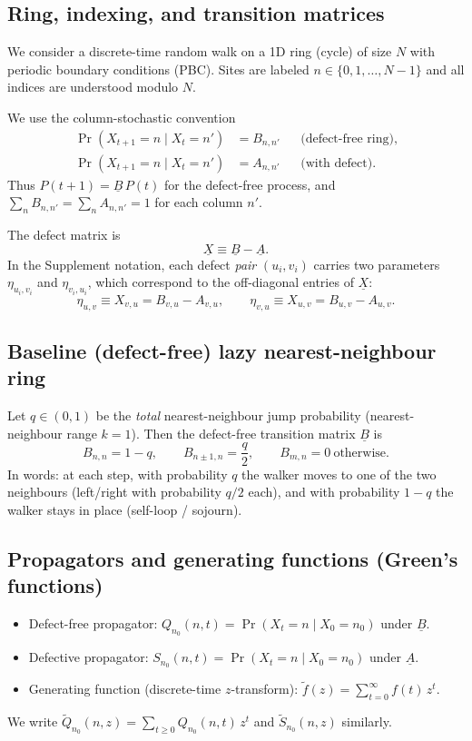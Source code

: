 \documentclass[11pt]{article}
\begin{document}
\subsection{Ring, indexing, and transition matrices}

We consider a discrete-time random walk on a 1D ring (cycle) of size $N$ with periodic boundary conditions (PBC).
Sites are labeled $n\in\{0,1,\dots,N-1\}$ and all indices are understood modulo $N$.

We use the column-stochastic convention
\[
\begin{aligned}
\Pr(X_{t+1}=n\mid X_t=n') &= B_{n,n'} &&\text{(defect-free ring)},\\
\Pr(X_{t+1}=n\mid X_t=n') &= A_{n,n'} &&\text{(with defect)}.
\end{aligned}
\]
Thus $P(t+1)=\underline{B}\,P(t)$ for the defect-free process, and $\sum_n B_{n,n'}=\sum_n A_{n,n'}=1$ for each column $n'$.

The defect matrix is
\[
\underline{X}\equiv \underline{B}-\underline{A}.
\]
In the Supplement notation, each defect \emph{pair} $(u_i,v_i)$ carries two parameters $\eta_{u_i,v_i}$ and $\eta_{v_i,u_i}$, which correspond to the off-diagonal entries of $\underline{X}$:
\[
\eta_{u,v}\equiv X_{v,u}=B_{v,u}-A_{v,u},\qquad \eta_{v,u}\equiv X_{u,v}=B_{u,v}-A_{u,v}.
\]

\subsection{Baseline (defect-free) lazy nearest-neighbour ring}
Let $q\in(0,1)$ be the \emph{total} nearest-neighbour jump probability (nearest-neighbour range $k=1$).
Then the defect-free transition matrix $\underline{B}$ is
\[
B_{n,n}=1-q,\qquad B_{n\pm 1,n}=\frac{q}{2},\qquad B_{m,n}=0\ \text{otherwise}.
\]
In words: at each step, with probability $q$ the walker moves to one of the two neighbours (left/right with probability $q/2$ each),
and with probability $1-q$ the walker stays in place (self-loop / sojourn).

\subsection{Propagators and generating functions (Green's functions)}
\begin{itemize}
\item Defect-free propagator: $Q_{n_0}(n,t)=\Pr(X_t=n\mid X_0=n_0)$ under $\underline{B}$.
\item Defective propagator: $S_{n_0}(n,t)=\Pr(X_t=n\mid X_0=n_0)$ under $\underline{A}$.
\item Generating function (discrete-time $z$-transform): $\tilde f(z)=\sum_{t=0}^{\infty} f(t)\,z^t$.
\end{itemize}
We write $\tilde Q_{n_0}(n,z)=\sum_{t\ge 0} Q_{n_0}(n,t)\,z^t$ and $\tilde S_{n_0}(n,z)$ similarly.
\end{document}
